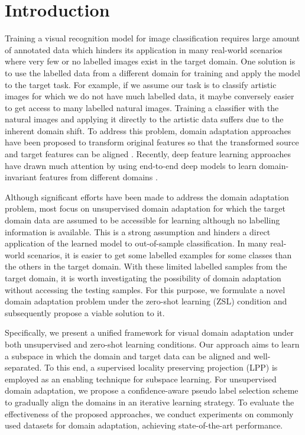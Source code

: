 \documentclass[conference]{IEEEtran}
\begin{document}
\section{Introduction}
Training a visual recognition model for image classification requires large amount of annotated data which hinders its application in many real-world scenarios where  very few or no labelled images exist in the target domain. One solution is to use the labelled data from a different domain for training and apply the model to the target task. For example, if we assume our task is to classify artistic images for which we do not have much labelled data, it maybe conversely easier to get access to many labelled natural images. Training a classifier with the natural images and applying it directly to the artistic data suffers due to the inherent domain shift. To address this problem, domain adaptation approaches have been proposed to transform original features so that the transformed source and target features can be aligned \cite{long2013transfer, long2014transfer, sun2016return, zhang2017joint, ghifary2017scatter, sun2017correlation, wang2018visual}. Recently, deep feature learning approaches have drawn much attention by using end-to-end deep models to learn domain-invariant features from different domains \cite{ganin2015unsupervised, long2015learning, ganin2016domain, long2016unsupervised, long2017deep, chen2018joint, pei2018multi, zhang2018collaborative, long2018conditional}.

Although significant efforts have been made to address the domain adaptation problem, most focus on unsupervised domain adaptation for which the target domain data are assumed to be accessible for learning although no labelling information is available. This is a strong assumption and hinders a direct application of the learned model to out-of-sample classification. In many real-world scenarios, it is easier to get some labelled examples for some classes than the others in the target domain. With these limited labelled samples from the target domain, it is worth investigating the possibility of domain adaptation without accessing the testing samples. For this purpose, we formulate a novel domain adaptation problem under the zero-shot learning (ZSL) \cite{wang2017zero} condition and subsequently propose a viable solution to it. 

Specifically, we present a unified framework for visual domain adaptation under both unsupervised and zero-shot learning conditions. Our approach aims to learn a subspace in which the domain and target data can be aligned and well-separated. To this end, a supervised locality preserving projection (LPP) \cite{he2004locality, wang2017zero} is employed as an enabling technique for subspace learning. For unsupervised domain adaptation, we propose a confidence-aware pseudo label selection scheme to gradually align the domains in an iterative learning strategy. To evaluate the effectiveness of the proposed approaches, we conduct experiments on commonly used datasets for domain adaptation, achieving state-of-the-art performance.
\end{document}
